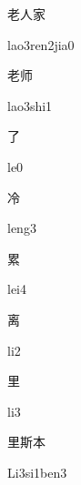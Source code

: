 \begin{verbete}{老人家}
\begin{pronuncia}{lao3ren2jia0}
\end{pronuncia}
\end{verbete}

\begin{verbete}{老师}
\begin{pronuncia}{lao3shi1}
\end{pronuncia}
\end{verbete}

\begin{verbete}[le0]{了}
\begin{pronuncia}{le0}
\end{pronuncia}
\end{verbete}

\begin{verbete}[leng3]{冷}
\begin{pronuncia}{leng3}
\end{pronuncia}
\end{verbete}

\begin{verbete}[lei4]{累}
\begin{pronuncia}{lei4}
\end{pronuncia}
\end{verbete}

\begin{verbete}[li2]{离}
\begin{pronuncia}{li2}
\end{pronuncia}
\end{verbete}

\begin{verbete}[li3]{里}
\begin{pronuncia}{li3}
\end{pronuncia}
\end{verbete}

\begin{verbete}[Li3si1ben3]{里斯本}
\begin{pronuncia}{Li3si1ben3}
\end{pronuncia}
\end{verbete}

